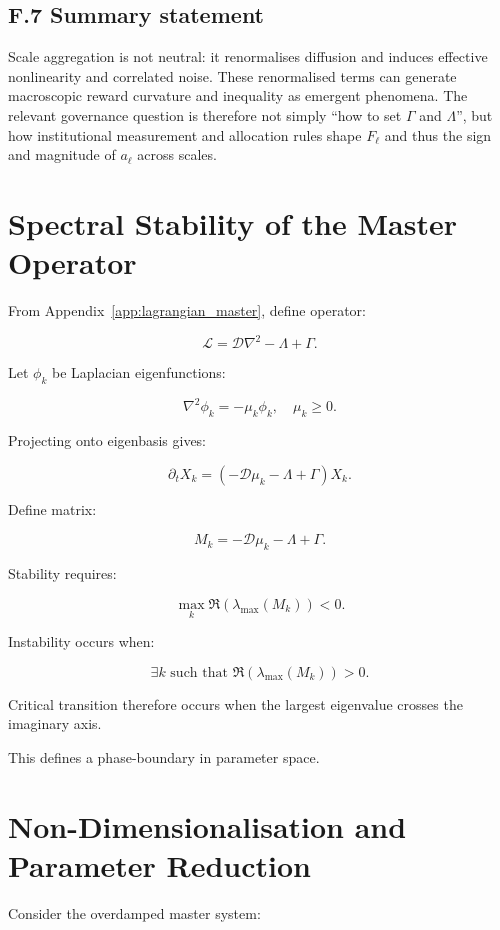 \documentclass[12pt,a4paper]{article}
\theoremstyle{definition}
\begin{document}
\subsection*{F.7 Summary statement}

Scale aggregation is not neutral: it renormalises diffusion and induces effective nonlinearity and correlated noise.
These renormalised terms can generate macroscopic reward curvature and inequality as emergent phenomena.  The relevant
governance question is therefore not simply ``how to set $\Gamma$ and $\Lambda$'', but how institutional measurement
and allocation rules shape $F_\ell$ and thus the sign and magnitude of $a_\ell$ across scales.

\section{Spectral Stability of the Master Operator}
\label{app:spectral}

From Appendix~\ref{app:lagrangian_master}, define operator:

\[
\mathcal{L}
=
\mathcal{D}\nabla^2 - \Lambda + \Gamma.
\]

Let $\phi_k$ be Laplacian eigenfunctions:

\[
\nabla^2 \phi_k = -\mu_k \phi_k,
\quad \mu_k \ge 0.
\]

Projecting onto eigenbasis gives:

\[
\partial_t X_k
=
\left(
- \mathcal{D}\mu_k
- \Lambda
+ \Gamma
\right) X_k.
\]

Define matrix:

\[
M_k = -\mathcal{D}\mu_k - \Lambda + \Gamma.
\]

Stability requires:

\[
\max_k \Re(\lambda_{\max}(M_k)) < 0.
\]

Instability occurs when:

\[
\exists k \text{ such that } 
\Re(\lambda_{\max}(M_k)) > 0.
\]

Critical transition therefore occurs when the largest eigenvalue
crosses the imaginary axis.

This defines a phase-boundary in parameter space.

\section{Non-Dimensionalisation and Parameter Reduction}
\label{app:nondimensional}

Consider the overdamped master system:
\end{document}
